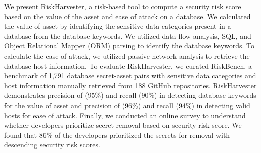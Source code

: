 We present RiskHarvester, a risk-based tool to compute a security risk score based on the value of the asset and ease of attack on a database. We calculated the value of asset by identifying the sensitive data categories present in a database from the database keywords. We utilized data flow analysis, SQL, and Object Relational Mapper (ORM) parsing to identify the database keywords. To calculate the ease of attack, we utilized passive network analysis to retrieve the database host information. To evaluate RiskHarvester, we curated RiskBench, a benchmark of 1,791 database secret-asset pairs with sensitive data categories and host information manually retrieved from 188 GitHub repositories. RiskHarvester demonstrates precision of (95\%) and recall (90\%) in detecting database keywords for the value of asset and precision of (96\%) and recall (94\%) in detecting valid hosts for ease of attack. Finally, we conducted an online survey to understand whether developers prioritize secret removal based on security risk score. We found that 86\% of the developers prioritized the secrets for removal with descending security risk scores.